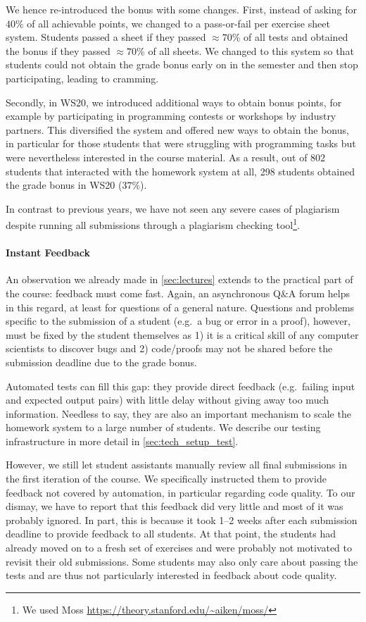 We hence re-introduced the bonus with some changes.
First, instead of asking for $40\%$ of all achievable points,
we changed to a pass-or-fail per exercise sheet system.
Students passed a sheet if they
passed $\approx 70\%$ of all tests
and obtained the bonus if they passed $\approx 70\%$ of all sheets.
We changed to this system so that students
could not obtain the grade bonus early on in the semester and then stop participating,
leading to cramming.

Secondly, in WS20, we introduced additional ways to
obtain bonus points,
for example by participating in programming contests or workshops by industry partners.
This diversified the system and offered new ways
to obtain the bonus,
in particular for those students that were struggling
with programming tasks but were nevertheless interested in the course material.
As a result, out of 802 students that interacted with the homework system at all, 298 students obtained the grade bonus in WS20 ($37\%$).

In contrast to previous years,
we have not seen any severe cases of plagiarism despite
running all submissions through a plagiarism checking tool\footnote{We used Moss \url{https://theory.stanford.edu/~aiken/moss/}}.

\paragraph{Instant Feedback}
An observation we already made in \cref{sec:lectures}
extends to the practical part of the course:
feedback must come fast.
Again, an asynchronous Q\&A forum helps in this regard,
at least for questions of a general nature.
Questions and problems specific to the submission of a student (e.g.\ a bug or error in a proof),
however, must be fixed by the student themselves as 1) it is a critical skill of any computer scientists to discover bugs and 2) code/proofs may not be shared before the submission deadline due to the grade bonus.

Automated tests can fill this gap:
they provide direct feedback (e.g.\ failing input and expected output pairs) with little delay
without giving away too much information.
Needless to say, they are also an important mechanism
to scale the homework system to a large number of students.
We describe our testing infrastructure in more detail in \cref{sec:tech_setup_test}.

However, we still let student assistants manually review all final submissions
in the first iteration of the course.
We specifically instructed them to provide feedback not covered by automation,
in particular regarding code quality.
To our dismay, we have to report that this feedback did very little and
most of it was probably ignored.
In part, this is because it took 1--2 weeks after each submission deadline to provide feedback to all students.
At that point, the students had already moved on to a fresh set of exercises and were probably not motivated to revisit their old submissions.
Some students may also only care about passing the tests
and are thus not particularly interested in feedback about code quality.


